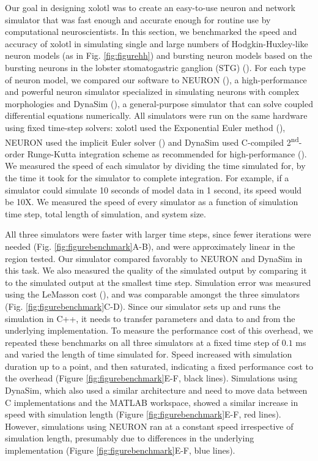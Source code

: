 \documentclass{frontiersSCNS} %
\begin{document}
Our goal in designing xolotl was to create an easy-to-use neuron and network simulator that was fast enough and accurate enough for routine use by computational neuroscientists. In this section, we benchmarked the speed and accuracy of xolotl in simulating single and large numbers of Hodgkin-Huxley-like neuron models (as in Fig. \ref{fig:figurehh}) and bursting neuron models based on the bursting neurons in the lobster stomatogastric ganglion (STG) (\cite{prinzSimilarNetworkActivity2004}). For each type of neuron model, we compared our software to  NEURON (\cite{hinesNEURONSimulationEnvironment1997}), a high-performance and powerful neuron simulator specialized in simulating neurons with complex morphologies and DynaSim (\cite{sherfeyDynaSimMATLABToolbox2018}), a general-purpose simulator that can solve coupled differential equations numerically. All simulators were run on the same hardware using fixed time-step solvers: xolotl used the Exponential Euler method (\cite{dayanTheoreticalNeuroscience2001}), NEURON used the  implicit Euler solver (\cite{hinesNEURONSimulationEnvironment1997}) and DynaSim used C-compiled 2\textsuperscript{nd}-order Runge-Kutta integration scheme as recommended for high-performance (\cite{sherfeyDynaSimMATLABToolbox2018}). We measured the speed of each simulator by dividing the time simulated for, by the time it took for the simulator to complete integration. For example, if a simulator could simulate 10 seconds of model data in 1 second, its speed would be 10X. We measured the speed of every simulator as a function of simulation time step, total length of simulation, and system size. 

All three simulators were faster with larger time steps, since fewer iterations were needed (Fig. \ref{fig:figurebenchmark}A-B), and were approximately linear in the region tested. Our simulator compared favorably to NEURON and DynaSim in this task. We also measured the quality of the simulated output by comparing it to the simulated output at the smallest time step. Simulation error was measured using the LeMasson cost (\cite{lemassonIntroductionEquationSolving2000}), and was comparable amongst the three simulators (Fig. \ref{fig:figurebenchmark}C-D). Since our simulator sets up and runs the simulation in C++, it needs to transfer parameters and data to and from the underlying implementation. To measure the performance cost of this overhead, we repeated these benchmarks on all three simulators at a fixed time step of $0.1$ ms and varied the length of time simulated for. Speed increased with simulation duration up to a point, and then saturated, indicating a fixed performance cost to the overhead (Figure \ref{fig:figurebenchmark}E-F, black lines). Simulations using DynaSim, which also used a similar architecture and need to move data between C implementations and the MATLAB workspace, showed a similar increase in speed with simulation length (Figure \ref{fig:figurebenchmark}E-F, red lines). However, simulations using NEURON ran at a constant speed irrespective of simulation length, presumably due to differences in the underlying implementation (Figure \ref{fig:figurebenchmark}E-F, blue lines).    
\end{document}
